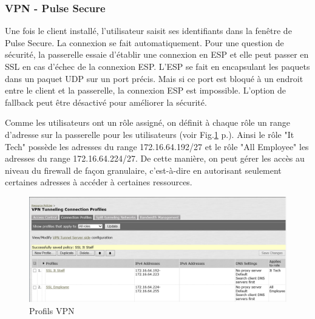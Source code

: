 \subsubsection{VPN - Pulse Secure}
Une fois le client installé, l'utilisateur saisit ses identifiants dans la fenêtre de Pulse Secure. 
La connexion se fait automatiquement. 
Pour une question de sécurité, la passerelle essaie d'établir une connexion en ESP et elle peut passer en SSL en cas d'échec de la connexion ESP.
L'ESP se fait en encapsulant les paquets dans un paquet UDP sur un port précis.
Mais si ce port est bloqué à un endroit entre le client et la passerelle, la connexion ESP est impossible.
L'option de fallback peut être désactivé pour améliorer la sécurité. 

Comme les utilisateurs ont un rôle assigné, on définit à chaque rôle un range d'adresse sur la passerelle pour les utilisateurs (voir Fig.\ref{fig:profilVPN} p.\pageref{fig:profilVPN}).
Ainsi le rôle "It Tech" possède les adresses du range 172.16.64.192/27 et le rôle "All Employee" les adresses du range 172.16.64.224/27.
De cette manière, on peut gérer les accès au niveau du firewall de façon granulaire, c'est-à-dire en autorisant seulement certaines adresses à accéder à certaines ressources.
\begin{figure}[ht]
	\centering
	\includegraphics[width=16cm]{juniper/VPNProfiles.png}
	\caption{Profils VPN}
	\label{fig:profilVPN}
\end{figure}